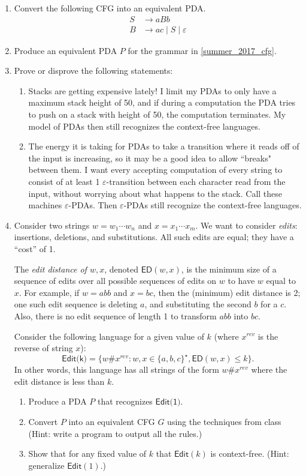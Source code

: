 \begin{enumerate}[resume]

\item \label{ex2017fcfg}   Convert the following CFG into an equivalent PDA.
\begin{align*}
S &\to aBb\\
B &\to ac \;|\;S\;|\;\varepsilon
\end{align*}


\item {} Produce an equivalent PDA $P$ for the grammar in \cref{summer_2017_cfg}.

\item {} Prove or disprove the following statements:
\begin{enumerate}
	\item Stacks are getting expensive lately! I limit my PDAs to only have a maximum stack height of 50, and if during a computation the PDA tries to push on a stack with height of 50, the computation terminates. My model of PDAs then still recognizes the context-free languages.
	\item The energy it is taking for PDAs to take a transition where it reads off of the input is increasing, so it may be a good idea to allow ``breaks" between them. I want every accepting computation of every string to consist of at least 1 $\varepsilon$-transition between each character read from the input, without worrying about what happens to the stack. Call these machines $\varepsilon$-PDAs. Then $\varepsilon$-PDAs still recognize the context-free languages.
\end{enumerate}

\item {} Consider two strings $w = w_1 \cdots w_n$ and $x = x_1 \cdots x_m$. We want to consider \emph{edits}: insertions, deletions, and substitutions. All such edits are equal; they have a ``cost'' of 1.

The \emph{edit distance of $w, x$}, denoted ${\textsf{ED}}(w,x)$, is the minimum size of a sequence of edits over all possible sequences of edits on $w$ to have $w$ equal to $x$. For example, if $w = abb$ and $x = bc$, then the (minimum) edit distance is 2; one such edit sequence is deleting $a$, and substituting the second $b$ for a $c$. Also, there is no edit sequence of length 1 to transform $abb$ into $bc$.

Consider the following language for a given value of $k$ (where $x^{rev}$ is the reverse of string $x$):
\[
\textsf{Edit(k)} = \{ w \# x^{rev} : w, x \in \{a, b, c\}^\star, \textsf{ED}(w,x) \le k  \}.
\]
In other words, this language has all strings of the form $w\# x^{rev}$ where the edit distance is less than $k$.
\begin{enumerate}
	\item Produce a PDA $P$ that recognizes $\textsf{Edit(1)}$.
	\item Convert $P$ into an equivalent CFG $G$ using the techniques from class (Hint: write a program to output all the rules.)
	\item Show that for any fixed value of $k$ that $\textsf{Edit}(k)$ is context-free. (Hint: generalize $\textsf{Edit}(1)$.)
\end{enumerate}


\end{enumerate}
